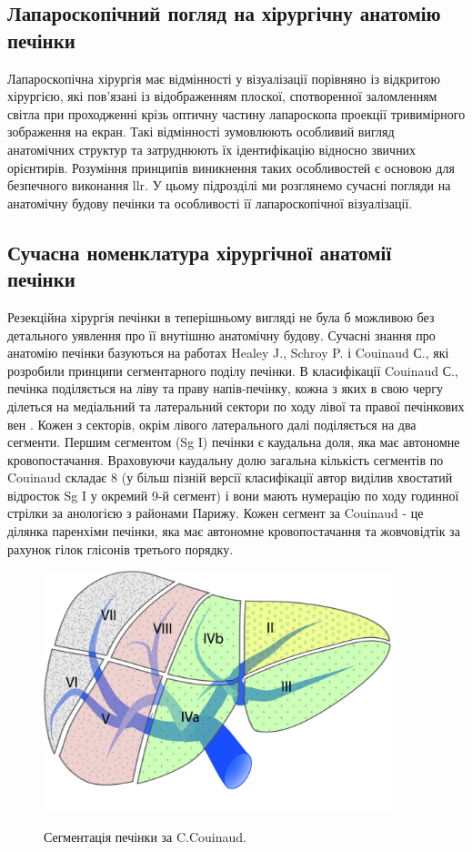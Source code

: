 \begin{refsection}
\section{Лапароскопічний погляд на хірургічну анатомію печінки}

Лапароскопічна хірургія має відмінності у візуалізації порівняно із відкритою хірургією, які пов'язані із відображенням плоскої, спотворенної заломленням світла при проходженні крізь оптичну частину лапароскопа проекції тривимірного зображення на екран. Такі відмінності зумовлюють особливий вигляд анатомічних структур та затруднюють їх ідентифікацію відносно звичних орієнтирів. Розуміння принципів виникнення таких особливостей є основою для безпечного виконання \acrshort{llr}. У цьому підрозділі ми розглянемо сучасні погляди на анатомічну будову печінки та особливості її лапароскопічної візуалізації.

\subsection{Сучасна номенклатура хірургічної анатомії печінки}

Резекційна хірургія печінки в теперішньому вигляді не була б можливою без детального уявлення про її внутішню анатомічну будову. Сучасні знання про анатомію печінки базуються на работах Healey J., Schroy P. і Couinaud С., які розробили принципи сегментарного поділу печінки. В класифікації Couinaud С., печінка поділяється на ліву та праву напів-печінку, кожна з яких в свою чергу ділеться на медіальний та латеральний сектори по ходу лівої та правої печінкових вен \cite{COUINAUD1954}. Кожен з секторів, окрім лівого латерального далі поділяється на два сегменти. Першим сегментом (Sg I) печінки є каудальна доля, яка має автономне кровопостачання. Враховуючи каудальну долю загальна кількість сегментів по Couinaud складає 8 (у більш пізній версії класифікації автор виділив хвостатий відросток Sg I у окремий 9-й сегмент) і вони мають нумерацію по ходу годинної стрілки за анологією з районами Парижу. Кожен сегмент за Couinaud - це ділянка паренхіми печінки, яка має автономне кровопостачання та жовчовідтік за рахунок гілок глісонів третього порядку. 

\begin{figure}[h]
\caption{Сегментація печінки за C.Couinaud.}

\includegraphics[width=0.9\textwidth]{Illustrations/Chapter_01/Couinaud.jpg}
\label{fig:Couinaud}


\end{figure}
\end{refsection}
